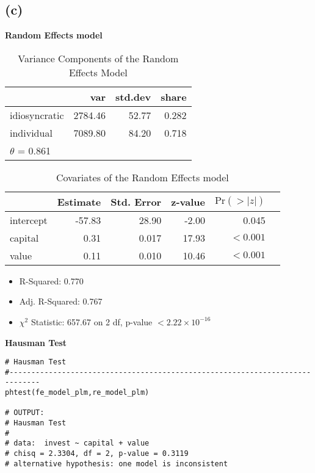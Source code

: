 \documentclass[a4paper]{article}
\begin{document}
\subsection*{(c)}
\textbf{Random Effects model}
\begin{table}[ht]
    \centering
    \begin{tabular}{lrrr}
        \toprule
            & var & std.dev & share \\
            \midrule
    idiosyncratic & 2784.46 & 52.77 & 0.282 \\
    individual    & 7089.80 & 84.20 & 0.718 \\
    \bottomrule
    \(\theta\) = 0.861\\
    \end{tabular}    
    \caption{Variance Components of the Random Effects Model}
\end{table}
\begin{table}[ht]
    \centering
    \begin{tabular}{@{}lrrrrr@{}}
        \toprule
                & Estimate  & Std. Error  & z-value & \(\text{Pr}(>|z|)\)\\
                \midrule
        intercept & -57.83 & 28.90 & -2.00 & 0.045 \\
        capital   & 0.31   & 0.017 & 17.93  & \(<0.001\)\\
        value     & 0.11   & 0.010 & 10.46 & \(<0.001\)\\
        \bottomrule
    \end{tabular}
    \caption{Covariates of the Random Effects model}
\end{table}
\begin{itemize}
    \item R-Squared: 0.770
    \item Adj. R-Squared: 0.767
    \item \(\chi^2\) Statistic: 657.67 on 2 df, p-value \(<2.22 \times 10^{-16}\) 
\end{itemize}

\noindent\textbf{Hausman Test}

\begin{lstlisting}[caption={R Code for Hausman Test}]
# Hausman Test
#-----------------------------------------------------------------------------
phtest(fe_model_plm,re_model_plm)

# OUTPUT:
# Hausman Test
# 
# data:  invest ~ capital + value
# chisq = 2.3304, df = 2, p-value = 0.3119
# alternative hypothesis: one model is inconsistent
\end{lstlisting}
\end{document}
